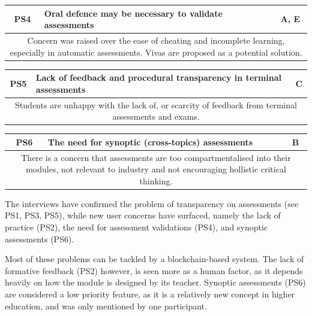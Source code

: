\begin{table}[!ht]
	\begin{tabularx}{\textwidth}{|c|X|c|}
		\hline
		PS4 & \textbf{Oral defence may be necessary to validate assessments} & A, E                 \\
		\hline
		\multicolumn{3}{|X|}{Concern was raised over the ease of cheating and incomplete
			learning, especially in automatic assessments. Vivas are proposed as a potential solution.} \\
		\hline
	\end{tabularx}
\end{table}
\begin{table}[!ht]
	\begin{tabularx}{\textwidth}{|c|X|c|}
		\hline
		PS5 & \textbf{Lack of feedback and procedural transparency in terminal assessments} & C \\
		\hline
		\multicolumn{3}{|X|}{Students are unhappy with the lack of, or scarcity of feedback
			from terminal assessments and exams.}                                                   \\
		\hline
	\end{tabularx}
\end{table}
\begin{table}[!ht]
	\begin{tabularx}{\textwidth}{|c|X|c|}
		\hline
		PS6 & \textbf{The need for synoptic (cross-topics) assessments} & B \\
		\hline
		\multicolumn{3}{|X|}{There is a concern that assessments are too
			compartmentalised into their modules, not relevant to industry and not encouraging
			hollistic critical thinking.}                                       \\
		\hline
	\end{tabularx}
\end{table}

The interviews have confirmed the problem of transparency on assessments (see PS1, PS3, PS5), 
while new user concerns have surfaced, namely the lack of practice (PS2), the need 
for assessment validations (PS4), and synoptic assessments (PS6).

Most of these problems can be tackled by a blockchain-based system. 
The lack of formative feedback (PS2) however, is seen more as a human factor, 
as it depends heavily on how the module is designed by its teacher. 
Synoptic assessments (PS6) are considered a low priority feature, 
as it is a relatively new concept in higher education, and was only mentioned by 
one participant.


